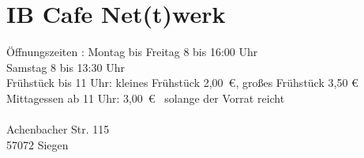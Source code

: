 \section{IB Cafe Net(t)werk}
Öffnungszeiten : Montag bis Freitag 8 bis 16:00 Uhr\\
Samstag 8 bis 13:30 Uhr \\
Frühstück bis 11 Uhr: kleines Frühstück 2,00~\euro, großes Frühstück 3,50 \euro \\
Mittagessen ab 11 Uhr: 3,00~\euro~ solange der Vorrat reicht \\
\\
Achenbacher Str. 115 \\
57072 Siegen